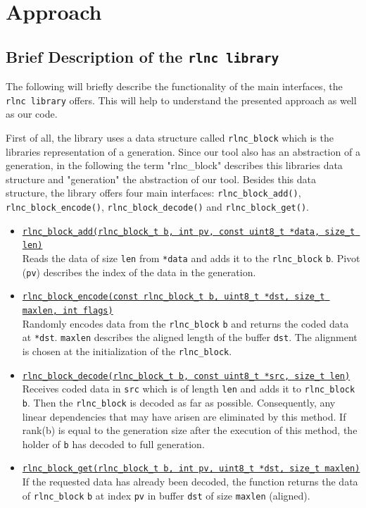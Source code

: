 \documentclass[a4paper,english,10pt]{tumarticle}
\begin{document}
\section{Approach}\label{app}

\subsection{Brief Description of the \texttt{rlnc library}}\label{app:desc}
The following will briefly describe the functionality of the main interfaces, the \texttt{rlnc library} offers.
This will help to understand the presented approach as well as our code.

First of all, the library uses a data structure called \texttt{rlnc\_block} which is the libraries representation of a generation.
Since our tool also has an abstraction of a generation, in the following the term "rlnc\_block" describes this libraries data structure and 
"generation" the abstraction of our tool. Besides this data structure, the library offers four main interfaces: 
\texttt{rlnc\_block\_add()}, \texttt{rlnc\_block\_encode()}, \texttt{rlnc\_block\_decode()} and \texttt{rlnc\_block\_get()}.

\begin{itemize}
    \item \underline{\texttt{rlnc\_block\_add(rlnc\_block\_t b, int pv, const uint8\_t *data, size\_t len)}}\\
    Reads the data of size \texttt{len} from \texttt{*data} and adds it to the \texttt{rlnc\_block} \texttt{b}. Pivot (\texttt{pv}) describes the index of the data in the generation.

    \item \underline{\texttt{rlnc\_block\_encode(const rlnc\_block\_t b, uint8\_t *dst, size\_t maxlen, int flags)}}\\
    Randomly encodes data from the \texttt{rlnc\_block} \texttt{b} and returns the coded data at \texttt{*dst}. 
    \texttt{maxlen} describes the aligned length of the buffer \texttt{dst}. The alignment is chosen at the initialization of the \texttt{rlnc\_block}.
    
    \item \underline{\texttt{rlnc\_block\_decode(rlnc\_block\_t b, const uint8\_t *src, size\_t len)}}\\
    Receives coded data in \texttt{src} which is of length \texttt{len} and adds it to \texttt{rlnc\_block} \texttt{b}. 
    Then the \texttt{rlnc\_block} is decoded as far as possible. 
    Consequently, any linear dependencies that may have arisen are eliminated by this method. If rank(b) is 
    equal to the generation size after the execution of this method, the holder of \texttt{b} has decoded to full generation.

    \item \underline{\texttt{rlnc\_block\_get(rlnc\_block\_t b, int pv, uint8\_t *dst, size\_t maxlen)}}\\
    If the requested data has already been decoded, the function returns the data of \texttt{rlnc\_block} \texttt{b} at index \texttt{pv} in buffer 
    \texttt{dst} of size \texttt{maxlen} (aligned).
  \end{itemize}
\end{document}

